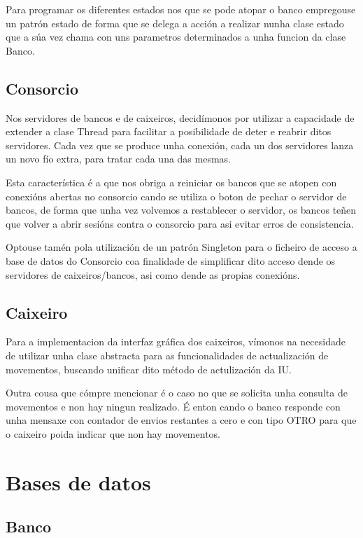 \documentclass[a4paper,titlepage]{article}
\begin{document}
Para programar os diferentes estados nos que se pode atopar o banco empregouse un patrón estado de forma que se delega a acción a realizar nunha clase estado que a súa vez chama con uns parametros determinados a unha funcion da clase Banco.


\subsection {Consorcio}
Nos servidores de bancos e de caixeiros, decidímonos por utilizar a capacidade de extender a clase Thread para facilitar a posibilidade de deter e reabrir ditos servidores. Cada vez que se produce unha conexión, cada un dos servidores lanza un novo fío extra, para tratar cada una das mesmas.

Esta característica é a que nos obriga a reiniciar os bancos que se atopen con conexións abertas no consorcio cando se utiliza o boton de pechar o servidor de bancos, de forma que unha vez volvemos a restablecer o servidor, os bancos teñen que volver a abrir sesións contra o consorcio para asi evitar erros de consistencia.

Optouse tamén pola utilización de un patrón Singleton para o ficheiro de acceso a base de datos do Consorcio coa finalidade de simplificar dito acceso dende os servidores de caixeiros/bancos, asi como dende as propias conexións.



\subsection {Caixeiro}
Para a implementacion da interfaz gráfica dos caixeiros, vímonos na necesidade de utilizar unha clase abstracta para as funcionalidades de actualización de movementos, buscando unificar dito método de actulización da IU.

Outra cousa que cómpre mencionar é o caso no que se solicita unha consulta de movementos e non hay ningun realizado. É enton cando o banco responde con unha mensaxe con contador de envios restantes a cero e con tipo OTRO para que o caixeiro poida indicar que non hay movementos.


\newpage

\clearpage
\newpage


\section {Bases de datos}
\subsection {Banco}
\end{document}

